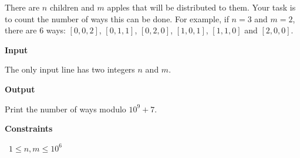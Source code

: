 There are $n$ children and $m$ apples that will be distributed to them. Your task is to count the number of ways this can be done.
For example, if $n=3$ and $m=2$, there are $6$ ways: $[0,0,2]$, $[0,1,1]$, $[0,2,0]$, $[1,0,1]$, $[1,1,0]$ and $[2,0,0]$.

\vspace{0.3cm}\noindent\textbf{Input}

The only input line has two integers $n$ and $m$.

\vspace{0.3cm}\noindent\textbf{Output}

Print the number of ways modulo $10^9+7$.

\vspace{0.3cm}\noindent\textbf{Constraints}

\textbullet\ $1 \le n,m \le 10^6$